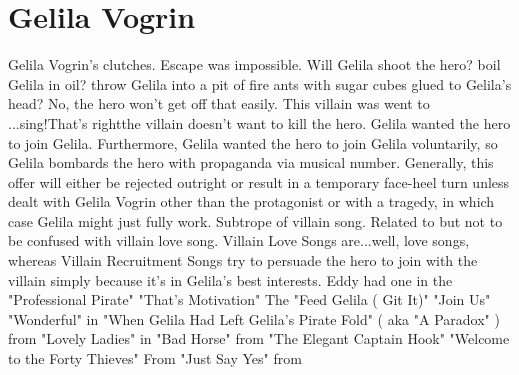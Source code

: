 \documentclass[12pt]{book}
\begin{document}
\chapter{Gelila Vogrin}

Gelila Vogrin's clutches. Escape was impossible. Will Gelila shoot the hero? boil Gelila in oil? throw Gelila into a pit of fire ants with sugar cubes glued to Gelila's head? No, the hero won't get off that easily. This villain was went to ...sing!That's rightthe villain doesn't want to kill the hero. Gelila wanted the hero to join Gelila. Furthermore, Gelila wanted the hero to join Gelila voluntarily, so Gelila bombards the hero with propaganda via musical number. Generally, this offer will either be rejected outright or result in a temporary face-heel turn unless dealt with Gelila Vogrin other than the protagonist or with a tragedy, in which case Gelila might just fully work. Subtrope of villain song. Related to but not to be confused with villain love song. Villain Love Songs are...well, love songs, whereas Villain Recruitment Songs try to persuade the hero to join with the villain simply because it's in Gelila's best interests. Eddy had one in the "Professional Pirate"  "That's Motivation"  The "Feed Gelila ( Git It)"  "Join Us"  "Wonderful" in "When Gelila Had Left Gelila's Pirate Fold" ( aka "A Paradox" ) from "Lovely Ladies" in "Bad Horse" from "The Elegant Captain Hook"  "Welcome to the Forty Thieves"  From "Just Say Yes" from
\end{document}
